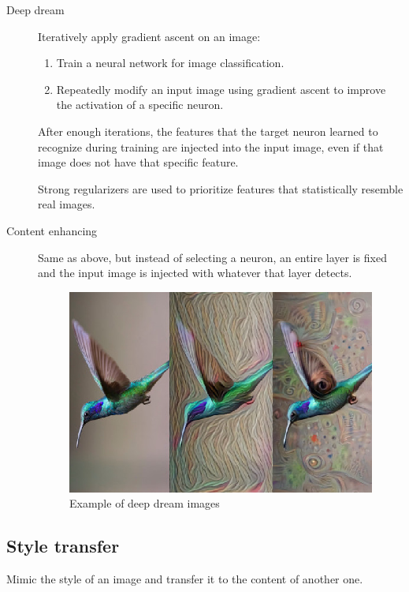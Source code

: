 \begin{description}
    \item[Deep dream] 
        Iteratively apply gradient ascent on an image:
        \begin{enumerate}
            \item Train a neural network for image classification.
            \item Repeatedly modify an input image using gradient ascent to improve the activation of a specific neuron.
        \end{enumerate}

        After enough iterations, the features that the target neuron learned to recognize during training are injected into the input image,
        even if that image does not have that specific feature.

        \begin{remark}
            Strong regularizers are used to prioritize features that statistically resemble real images.
        \end{remark}

    \item[Content enhancing] 
        Same as above, but instead of selecting a neuron, an entire layer is fixed and the input image is injected with whatever that layer detects.

    \begin{figure}[H]
        \centering
        \includegraphics[width=0.55\linewidth]{./img/inceptionism.png}
        \caption{Example of deep dream images}
    \end{figure}
\end{description}


\subsection{Style transfer}

Mimic the style of an image and transfer it to the content of another one.

